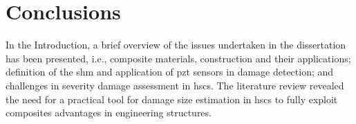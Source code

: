 \section{Conclusions}
\label{sec:conclusionsIntro}

In the Introduction, a brief overview of the issues undertaken in the dissertation has been presented,  i.e., composite materials, construction and their applications;  definition of the \ac{shm} and application of \ac{pzt} sensors in damage detection; and challenges in severity damage assessment in \acp{hsc}.
The literature review revealed the need for a practical tool for damage size estimation in \acp{hsc} to fully exploit composites advantages in engineering structures.